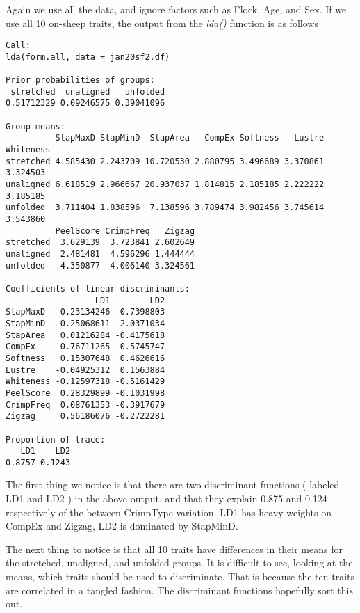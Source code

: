 \documentclass[titlepage]{article}  %
\begin{document}
Again we use all the data, and ignore factors such as Flock, Age, and Sex. If we use all 10 on-sheep traits, the output from the {\em lda()} function is as follows
\begin{verbatim}
Call:
lda(form.all, data = jan20sf2.df)

Prior probabilities of groups:
 stretched  unaligned   unfolded 
0.51712329 0.09246575 0.39041096 

Group means:
          StapMaxD StapMinD  StapArea   CompEx Softness   Lustre Whiteness
stretched 4.585430 2.243709 10.720530 2.880795 3.496689 3.370861  3.324503
unaligned 6.618519 2.966667 20.937037 1.814815 2.185185 2.222222  3.185185
unfolded  3.711404 1.838596  7.138596 3.789474 3.982456 3.745614  3.543860
          PeelScore CrimpFreq   Zigzag
stretched  3.629139  3.723841 2.602649
unaligned  2.481481  4.596296 1.444444
unfolded   4.350877  4.006140 3.324561

Coefficients of linear discriminants:
                  LD1        LD2
StapMaxD  -0.23134246  0.7398803
StapMinD  -0.25068611  2.0371034
StapArea   0.01216284 -0.4175618
CompEx     0.76711265 -0.5745747
Softness   0.15307648  0.4626616
Lustre    -0.04925312  0.1563884
Whiteness -0.12597318 -0.5161429
PeelScore  0.28329899 -0.1031998
CrimpFreq  0.08761353 -0.3917679
Zigzag     0.56186076 -0.2722281

Proportion of trace:
   LD1    LD2 
0.8757 0.1243 
\end{verbatim}

The first thing we notice is that there are two discriminant functions ( labeled LD1 and LD2 )  in the above output, and that they explain 0.875 and 0.124 respectively of the between CrimpType variation. LD1 has heavy weights on CompEx and Zigzag, LD2 is dominated by StapMinD.

The next thing to notice is that all 10 traits have differences in their means for the stretched, unaligned, and unfolded groups. It is difficult to see, looking at the means, which traits should be used to discriminate. That is because the ten traits are correlated in a tangled fashion. The discriminant functions hopefully sort this out.
\end{document}
